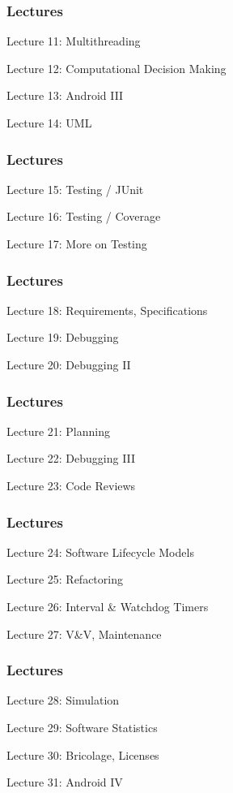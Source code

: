 \begin{frame}
\frametitle{Lectures}

{\LARGE

Lecture 11: Multithreading

Lecture 12: Computational Decision Making

Lecture 13: Android III

Lecture 14: UML
}

\end{frame}

\begin{frame}
\frametitle{Lectures}

{\LARGE

Lecture 15: Testing / JUnit

Lecture 16: Testing / Coverage

Lecture 17: More on Testing

}

\end{frame}

\begin{frame}
\frametitle{Lectures}

{\LARGE

Lecture 18: Requirements, Specifications

Lecture 19: Debugging

Lecture 20: Debugging II
}

\end{frame}

\begin{frame}
\frametitle{Lectures}
{\LARGE

Lecture 21: Planning

Lecture 22: Debugging III

Lecture 23: Code Reviews
}

\end{frame}

\begin{frame}
\frametitle{Lectures}
{\LARGE

Lecture 24: Software Lifecycle Models

Lecture 25: Refactoring

Lecture 26: Interval \& Watchdog Timers

Lecture 27: V\&V, Maintenance
}

\end{frame}


\begin{frame}
\frametitle{Lectures}
{\LARGE

Lecture 28: Simulation

Lecture 29: Software Statistics

Lecture 30: Bricolage, Licenses

Lecture 31: Android IV
}

\end{frame}

